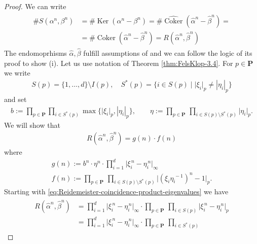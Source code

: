 \documentclass[oneside]{amsart}
\def\Ker{\operatorname{Ker}}
\def\Coker{\operatorname{Coker}}
\begin{document}
\begin{proof}
  We can write
  \begin{align} \label{eq:synchronization=reidemeister-of-dual}
  \begin{split}
    \# S(\alpha^n, \beta^n) &= \# \Ker(\alpha^n - \beta^n)
    = \# \widehat{\Coker}(\widehat{\alpha}^n - \widehat{\beta}^n) = \\
    &= \# \Coker(\widehat{\alpha}^n - \widehat{\beta}^n) = R(\widehat{\alpha}^n, \widehat{\beta}^n)
  \end{split}
  \end{align}
  The endomoprhisms $\widehat{\alpha}, \widehat{\beta}$ fulfill assumptions of \cite[Theorem~4.3]{FelsKlop}
  and we can follow the logic of its proof to show (i).
  Let us use notation of Theorem \ref{thm:FelsKlop-3.4}.
  For $p \in \mathbf{P}$ we write
  \begin{align*}
    S(p) = \{1,\dots,d\}\setminus I(p), \quad S^*(p) = \big\{i \in S(p) \mid \lvert \xi_{i} \rvert_p \neq |\eta_{i}|_p \big\}
  \end{align*}
  and set
  \begin{align*}
     b := \prod_{p \in \mathbf{P}} \prod_{i \in S^*(p)} \max \{ \lvert \xi_{i} \rvert_p, |\eta_i|_p\}, \qquad
     \eta := \prod_{p \in \mathbf{P}} \, \prod_{i \in S(p) \setminus S^*(p)}\lvert \eta_{i} \rvert_p.
  \end{align*}
  We will show that
  \begin{align*}
    R(\widehat{\alpha}^n, \widehat{\beta}^n) = g(n) \cdot f(n)
  \end{align*}
  where
  \begin{gather*}
      g(n) := b^n\cdot\eta^n \cdot \prod_{i=1}^{d} \lvert \xi_{i}^{\, n} - \eta_{i}^{\, n}
      \rvert_\infty \\
      f(n) := \prod_{p \in \mathbf{P}} \, \prod_{i \in S(p)\setminus
        S^*(p)} \big\vert (\xi_{i} \eta_{i}^{\, -1})^n - 1 \big\vert_p.
  \end{gather*}
  Starting with \eqref{eq:Reidemeister-coincidence-product-eigenvalues} we have
  \begin{align}\label{eq:Reid}
  \begin{split}
    R(\widehat{\alpha}^n,\widehat{\beta}^n)
        & =  \prod_{i=1}^d \lvert \xi_i^{\, n} - \eta_i^{\, n} \rvert_\infty \cdot
          \prod_{p \in \mathbf{P}} \, \prod_{i  \in S(p)} \lvert \xi_i^{\, n} -
          \eta_i^{\, n} \rvert_p \\
        & = \prod_{i=1}^d \lvert \xi_i^{\, n} - \eta_i^{\, n}
          \rvert_\infty \cdot \prod_{p \in \mathbf{P}} \, \prod_{i \in S^*(p)}

\end{split}
\end{align}
\end{proof}
\end{document}
